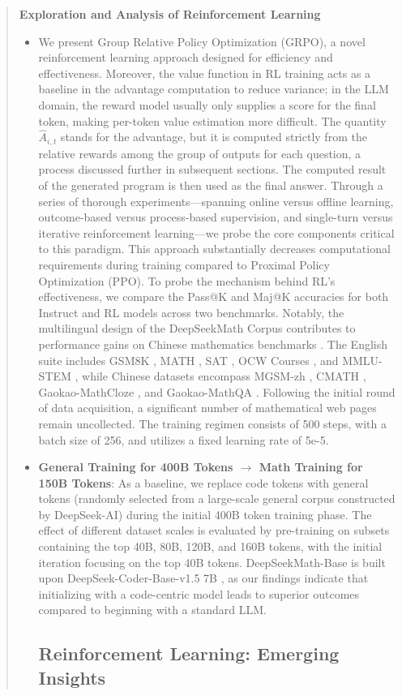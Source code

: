 \begin{abstract}
\begin{itemize}[topsep=0pt]
\textbf{Exploration and Analysis of Reinforcement Learning}

\begin{itemize}[topsep=0pt]
    \item We present Group Relative Policy Optimization (GRPO), a novel reinforcement learning approach designed for efficiency and effectiveness. Moreover, the value function in RL training acts as a baseline in the advantage computation to reduce variance; in the LLM domain, the reward model usually only supplies a score for the final token, making per-token value estimation more difficult. The quantity $\hat{A}_{i,t}$ stands for the advantage, but it is computed strictly from the relative rewards among the group of outputs for each question, a process discussed further in subsequent sections. The computed result of the generated program is then used as the final answer. Through a series of thorough experiments—spanning online versus offline learning, outcome-based versus process-based supervision, and single-turn versus iterative reinforcement learning—we probe the core components critical to this paradigm. This approach substantially decreases computational requirements during training compared to Proximal Policy Optimization (PPO). To probe the mechanism behind RL’s effectiveness, we compare the Pass@K and Maj@K accuracies for both Instruct and RL models across two benchmarks. Notably, the multilingual design of the DeepSeekMath Corpus contributes to performance gains on Chinese mathematics benchmarks \citep{wei2023cmath,agieval}. The English suite includes GSM8K \citep{gsm8k}, MATH \citep{MATH}, SAT \citep{llemma}, OCW Courses \citep{minerva}, and MMLU-STEM \citep{mmlu}, while Chinese datasets encompass MGSM-zh \citep{mgsm}, CMATH \citep{wei2023cmath}, Gaokao-MathCloze \citep{agieval}, and Gaokao-MathQA \citep{agieval}. Following the initial round of data acquisition, a significant number of mathematical web pages remain uncollected. The training regimen consists of 500 steps, with a batch size of 256, and utilizes a fixed learning rate of 5e-5. \item \textbf{General Training for 400B Tokens $\rightarrow$ Math Training for 150B Tokens}: As a baseline, we replace code tokens with general tokens (randomly selected from a large-scale general corpus constructed by DeepSeek-AI) during the initial 400B token training phase. The effect of different dataset scales is evaluated by pre-training on subsets containing the top 40B, 80B, 120B, and 160B tokens, with the initial iteration focusing on the top 40B tokens. DeepSeekMath-Base is built upon DeepSeek-Coder-Base-v1.5 7B \citep{deepseek-coder}, as our findings indicate that initializing with a code-centric model leads to superior outcomes compared to beginning with a standard LLM. \subsection{Reinforcement Learning: Emerging Insights}

\end{itemize}
\end{itemize}
\end{abstract}
